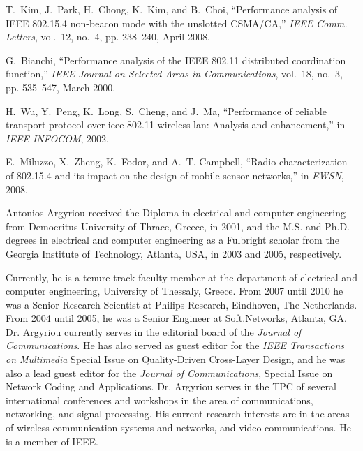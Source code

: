 \documentclass[10pt]{IEEEtran}
\begin{document}
\begin{thebibliography}{10}
T.~Kim, J.~Park, H.~Chong, K.~Kim, and B.~Choi, ``Performance analysis of
  {IEEE} 802.15.4 non-beacon mode with the unslotted {CSMA/CA},'' \emph{IEEE
  Comm. Letters}, vol.~12, no.~4, pp. 238--240, April 2008.

G.~Bianchi, ``Performance analysis of the {IEEE} 802.11 distributed
  coordination function,'' \emph{IEEE Journal on Selected Areas in
  Communications}, vol.~18, no.~3, pp. 535--547, March 2000.

H.~Wu, Y.~Peng, K.~Long, S.~Cheng, and J.~Ma, ``Performance of reliable
  transport protocol over ieee 802.11 wireless lan: Analysis and enhancement,''
  in \emph{IEEE INFOCOM}, 2002.

E.~Miluzzo, X.~Zheng, K.~Fodor, and A.~T. Campbell, ``Radio characterization of
  802.15.4 and its impact on the design of mobile sensor networks,'' in
  \emph{EWSN}, 2008.

\end{thebibliography}


\begin{IEEEbiographynophoto}{Antonios Argyriou} received the Diploma in electrical and computer engineering from Democritus University of Thrace, Greece, in 2001, and the M.S. and Ph.D. degrees in electrical and computer engineering as a Fulbright scholar from the Georgia Institute of Technology, Atlanta, USA, in 2003 and 2005, respectively.

Currently, he is a tenure-track faculty member at the department of electrical and computer engineering, University of Thessaly, Greece. From 2007 until 2010 he was a Senior Research Scientist at Philips Research, Eindhoven, The Netherlands. From 2004 until 2005, he was a Senior Engineer at Soft.Networks, Atlanta, GA. Dr. Argyriou currently serves in the editorial board of the \textit{Journal of Communications}. He has also served as guest editor for the \textit{IEEE Transactions on Multimedia} Special Issue on Quality-Driven Cross-Layer Design, and he was also a lead guest editor for the \textit{Journal of Communications}, Special Issue on Network Coding and Applications. Dr. Argyriou serves in the TPC of several international conferences and workshops in the area of communications, networking, and signal processing. His current research interests are in the areas of wireless communication systems and networks, and video communications. He is a member of IEEE.
\end{IEEEbiographynophoto}
\end{document}
